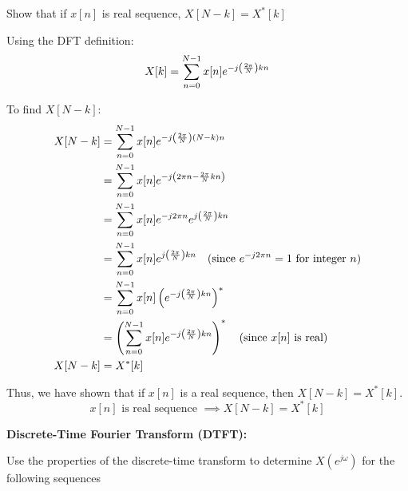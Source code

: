 \documentclass[a4paper, 10pt]{article}
\begin{document}

\newpage

\begin{subproblems}[start=2]
    \item Show that if \( x[n] \) is real sequence, \( X[N - k] = X^{*}[k] \)
\end{subproblems}

\begin{solution}
Using the DFT definition:
\[ X[k] = \sum_{n=0}^{N-1} x[n] e^{-j \left( \frac{2\pi}{N} \right) kn} \]

To find \( X[N - k] \):
\begin{align*}
    X[N - k] &= \sum_{n=0}^{N-1} x[n] e^{-j \left( \frac{2\pi}{N} \right) (N - k)n} \\
    &= \sum_{n=0}^{N-1} x[n] e^{-j \left( 2\pi n - \frac{2\pi}{N} kn\right)} \\
    &= \sum_{n=0}^{N-1} x[n] e^{-j 2\pi n} e^{j \left( \frac{2\pi}{N} \right) kn} \\
    &= \sum_{n=0}^{N-1} x[n] e^{j \left( \frac{2\pi}{N} \right) kn} \quad \text{(since \( e^{-j 2\pi n} = 1 \) for integer \( n \))} \\
    &= \sum_{n=0}^{N-1} x[n] \left( e^{-j \left( \frac{2\pi}{N} \right) kn} \right)^{*} \\
    &= \left( \sum_{n=0}^{N-1} x[n] e^{-j \left( \frac{2\pi}{N} \right) kn} \right)^{*} \quad \text{(since \( x[n] \) is real)} \\
    X[N - k] &= X^{*}[k]
\end{align*}

Thus, we have shown that if \( x[n] \) is a real sequence, then \( X[N - k] = X^{*}[k] \).
\[ \boxed{ x[n] \text{ is real sequence } \implies X[N - k] = X^{*}[k] } \]
\end{solution}

\newpage

\begin{problem}
    \textbf{Discrete-Time Fourier Transform (DTFT):}
\end{problem}

\begin{subproblems}
    \item Use the properties of the discrete-time transform to determine \( X(e^{j\omega}) \) for the following sequences
\end{subproblems}
\end{document}
